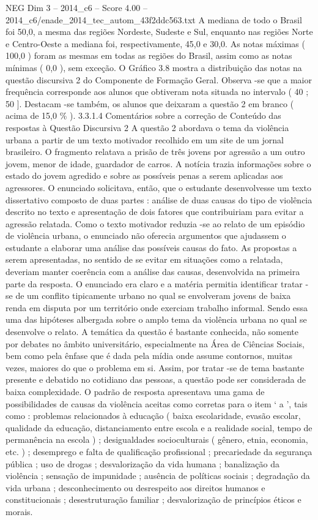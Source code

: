 \begin{textsample}{NEG Dim 3 – 2014\_c6 – Score 4.00 – 2014\_c6/enade\_2014\_tec\_autom\_43f2ddc563.txt}
A mediana de todo o Brasil foi 50,0, a mesma das regiões Nordeste, Sudeste e Sul, enquanto nas regiões Norte e Centro-Oeste a mediana foi, respectivamente, 45,0 e 30,0.
As notas máximas ( 100,0 ) foram as mesmas em todas as regiões do Brasil, assim como as notas mínimas ( 0,0 ), sem exceção.
O Gráfico 3.8 mostra a distribuição das notas na questão discursiva 2 do Componente de Formação Geral.
Observa -se que a maior frequência corresponde aos alunos que obtiveram nota situada no intervalo ( 40 ; 50 ].
Destacam -se também, os alunos que deixaram a questão 2 em branco ( acima de 15,0 \% ). 3.3.1.4 Comentários sobre a correção de Conteúdo das respostas à Questão Discursiva 2 A questão 2 abordava o tema da violência urbana a partir de um texto motivador recolhido em um site de um jornal brasileiro.
O fragmento relatava a prisão de três jovens por agressão a um outro jovem, menor de idade, guardador de carros.
A notícia trazia informações sobre o estado do jovem agredido e sobre as possíveis penas a serem aplicadas aos agressores.
O enunciado solicitava, então, que o estudante desenvolvesse um texto dissertativo composto de duas partes : análise de duas causas do tipo de violência descrito no texto e apresentação de dois fatores que contribuiriam para evitar a agressão relatada.
Como o texto motivador reduzia -se ao relato de um episódio de violência urbana, o enunciado não oferecia argumentos que ajudassem o estudante a elaborar uma análise das possíveis causas do fato.
As propostas a serem apresentadas, no sentido de se evitar em situações como a relatada, deveriam manter coerência com a análise das causas, desenvolvida na primeira parte da resposta.
O enunciado era claro e a matéria permitia identificar tratar -se de um conflito tipicamente urbano no qual se envolveram jovens de baixa renda em disputa por um território onde exerciam trabalho informal.
Sendo essa uma das hipóteses albergada sobre o amplo tema da violência urbana no qual se desenvolve o relato.
A temática da questão é bastante conhecida, não somente por debates no âmbito universitário, especialmente na Área de Ciências Sociais, bem como pela ênfase que é dada pela mídia onde assume contornos, muitas vezes, maiores do que o problema em si.
Assim, por tratar -se de tema bastante presente e debatido no cotidiano das pessoas, a questão pode ser considerada de baixa complexidade.
O padrão de resposta apresentava uma gama de possibilidades de causas da violência aceitas como corretas para o item ‘ a ’, tais como : problemas relacionados à educação ( baixa escolaridade, evasão escolar, qualidade da educação, distanciamento entre escola e a realidade social, tempo de permanência na escola ) ; desigualdades socioculturais ( gênero, etnia, economia, etc. ) ; desemprego e falta de qualificação profissional ; precariedade da segurança pública ; uso de drogas ; desvalorização da vida humana ; banalização da violência ; sensação de impunidade ; ausência de políticas sociais ; degradação da vida urbana ; desconhecimento ou desrespeito aos direitos humanos e constitucionais ; desestruturação familiar ; desvalorização de princípios éticos e morais.

\end{textsample}
